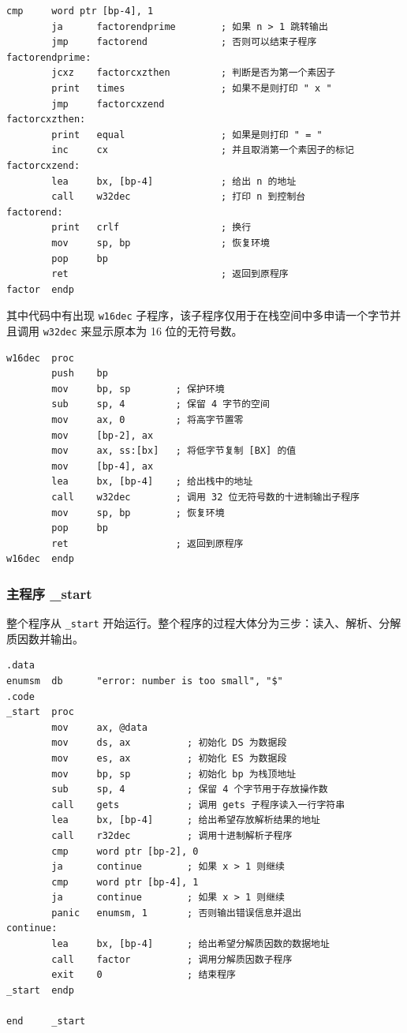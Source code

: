 \begin{lstlisting}[language={[x86masm]Assembler},morekeywords={}]
        cmp     word ptr [bp-4], 1
        ja      factorendprime        ; 如果 n > 1 跳转输出
        jmp     factorend             ; 否则可以结束子程序
factorendprime:
        jcxz    factorcxzthen         ; 判断是否为第一个素因子
        print   times                 ; 如果不是则打印 " x "
        jmp     factorcxzend
factorcxzthen:
        print   equal                 ; 如果是则打印 " = "
        inc     cx                    ; 并且取消第一个素因子的标记
factorcxzend:
        lea     bx, [bp-4]            ; 给出 n 的地址
        call    w32dec                ; 打印 n 到控制台
factorend:
        print   crlf                  ; 换行
        mov     sp, bp                ; 恢复环境
        pop     bp
        ret                           ; 返回到原程序
factor  endp
\end{lstlisting}

其中代码中有出现 \verb|w16dec| 子程序，该子程序仅用于在栈空间中多申请一个字节并且调用 \verb|w32dec| 来显示原本为 16 位的无符号数。

\begin{lstlisting}[language={[x86masm]Assembler},morekeywords={}]
w16dec  proc
        push    bp
        mov     bp, sp        ; 保护环境
        sub     sp, 4         ; 保留 4 字节的空间
        mov     ax, 0         ; 将高字节置零
        mov     [bp-2], ax
        mov     ax, ss:[bx]   ; 将低字节复制 [BX] 的值
        mov     [bp-4], ax
        lea     bx, [bp-4]    ; 给出栈中的地址
        call    w32dec        ; 调用 32 位无符号数的十进制输出子程序
        mov     sp, bp        ; 恢复环境
        pop     bp
        ret                   ; 返回到原程序
w16dec  endp
\end{lstlisting}

\subsubsection{主程序 \_start}

整个程序从 \verb|_start| 开始运行。整个程序的过程大体分为三步：读入、解析、分解质因数并输出。

\begin{lstlisting}[language={[x86masm]Assembler},morekeywords={}]
.data
enumsm  db      "error: number is too small", "$"
.code
_start  proc
        mov     ax, @data
        mov     ds, ax          ; 初始化 DS 为数据段
        mov     es, ax          ; 初始化 ES 为数据段
        mov     bp, sp          ; 初始化 bp 为栈顶地址
        sub     sp, 4           ; 保留 4 个字节用于存放操作数
        call    gets            ; 调用 gets 子程序读入一行字符串
        lea     bx, [bp-4]      ; 给出希望存放解析结果的地址
        call    r32dec          ; 调用十进制解析子程序
        cmp     word ptr [bp-2], 0
        ja      continue        ; 如果 x > 1 则继续
        cmp     word ptr [bp-4], 1
        ja      continue        ; 如果 x > 1 则继续
        panic   enumsm, 1       ; 否则输出错误信息并退出
continue:
        lea     bx, [bp-4]      ; 给出希望分解质因数的数据地址
        call    factor          ; 调用分解质因数子程序
        exit    0               ; 结束程序
_start  endp

end     _start
\end{lstlisting}

